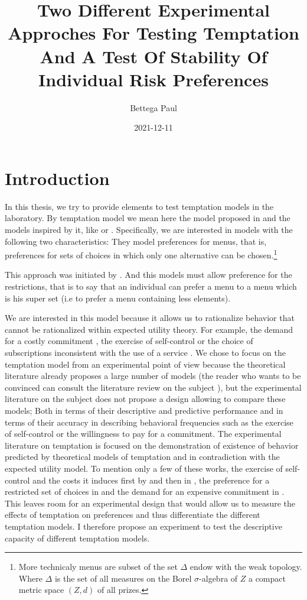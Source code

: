 \documentclass[
]{book}
\title{Two Different Experimental Approches For Testing Temptation And A Test Of Stability Of Individual Risk Preferences}
\author{Bettega Paul}
\date{2021-12-11}
\begin{document}
\maketitle

{
\setcounter{tocdepth}{1}
\tableofcontents
}
\hypertarget{intro1}{%
\chapter{Introduction}\label{intro1}}

In this thesis, we try to provide elements to test temptation models in the
laboratory.
By temptation model we mean here the model proposed in \citet{gul2001temptation} and
the models inspired by it, like \citet{noor2010uphill} or \citet{noor2015menu}.
Specifically, we are interested in models with the following two characteristics:
They model preferences for menus, that is, preferences for sets of choices in
which only one alternative can be chosen.\footnote{More technicaly menus are subset of the set \(\Delta\) endow with the weak
  topology.
  Where \(\Delta\) is the set of all measures on the Borel \(\sigma\)-algebra of \(Z\) a
  compact metric space \((Z,d)\) of all prizes.}

This approach was initiated by \citet{kreps1979representation}.
And this models must allow preference for the restrictions, that is to say that
an individual can prefer a menu to a menu which is his super set
(i.e to prefer a menu containing less elements).

We are interested in this model because it allows us to rationalize behavior
that cannot be rationalized within expected utility theory.
For example, the demand for a costly commitment \citep{bryan2010commitment, ashraf2006tying}, the exercise of self-control \citep{dellavigna2004contract} or the choice of subscriptions inconsistent with the use of a service \citep{dellavigna2006paying}.
We chose to focus on the temptation model from an experimental point of view
because the theoretical literature already proposes a large number of models
(the reader who wants to be convinced can consult the literature review on the subject \citet{lipman2013temptation}), but the experimental literature on the subject does not propose a design allowing to compare these models;
Both in terms of their descriptive and predictive performance and in terms of their accuracy in describing behavioral frequencies such as the exercise of self-control or the willingness to pay for a commitment.
The experimental literature on temptation is focused on the demonstration of existence of
behavior predicted by theoretical models of temptation and in contradiction with
the expected utility model.
To mention only a few of these works, the exercise of self-control and the costs
it induces first by \citet{mischel1989delay} and then in \citet{kuhn2014self}, the preference for a
restricted set of choices in \citet{toussaert2018eliciting} and the demand for an expensive
commitment in \citet{houser2018temptation}.
This leaves room for an experimental design that would allow us to measure the
effects of temptation on preferences and thus differentiate the different
temptation models.
I therefore propose an experiment to test the descriptive capacity of different
temptation models.
\end{document}
